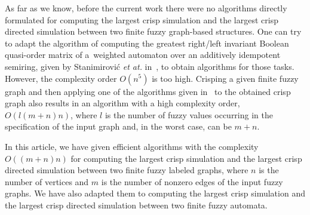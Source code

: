 \documentclass[11pt]{article}
\newcommand{\red}[1]{{#1}\xspace}
\begin{document}
As far as we know, before the current work there were no algorithms directly formulated for computing the largest crisp simulation and the largest crisp directed simulation between two finite fuzzy graph-based structures. One can try to adapt the algorithm of computing the greatest right/left invariant Boolean quasi-order matrix of a~weighted automaton over an additively idempotent semiring, given by Stanimirovi{\'c} {\em et at.} in~\cite{StanimirovicSC2019}, to obtain algorithms for those tasks. However, the complexity order $O(n^5)$ is too high. \red{Crisping a given finite fuzzy graph and then applying one of the algorithms given in~\cite{BloomP95,HenzingerHK95,CompBSDLP} to the obtained crisp graph also results in an algorithm with a high complexity order, $O(l(m+n)n)$, where $l$ is the number of fuzzy values occurring in the specification of the input graph and, in the worst case, can be $m+n$.} 

In this article, we have given efficient algorithms with the complexity $O((m+n)n)$ for computing the largest crisp simulation and the largest crisp directed simulation between two finite fuzzy labeled graphs, where $n$ is the number of vertices and $m$ is the number of nonzero edges of the input fuzzy graphs. \red{We have also adapted them to computing the largest crisp simulation and the largest crisp directed simulation between two finite fuzzy automata.} 




\end{document}
